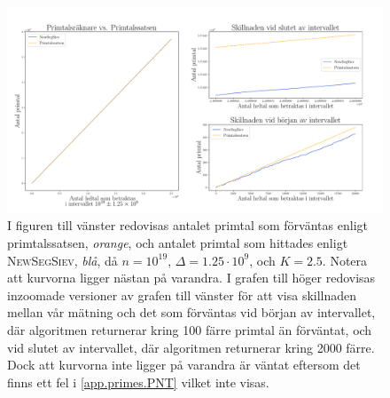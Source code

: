 \begin{figure}[h] %
    \centering
    \includegraphics[width = \textwidth]{coen/Images/Primes.pdf}
    \caption{I figuren till vänster redovisas antalet primtal som förväntas enligt primtalssatsen, \textit{orange}, och antalet primtal som hittades enligt \textsc{NewSegSiev}, \textit{blå}, då \(n = 10^{19}\), \(\Delta = 1.25\cdot10^{9}\), och \(K = 2.5\). 
    Notera att kurvorna ligger nästan på varandra. 
    I grafen till höger redovisas inzoomade versioner av grafen till vänster för att visa skillnaden mellan vår mätning och det som förväntas vid början av intervallet, där algoritmen returnerar kring 100 färre primtal än förväntat, och vid slutet av intervallet, där algoritmen returnerar kring 2000 färre.
    Dock att kurvorna inte ligger på varandra är väntat eftersom det finns ett fel i \ref{app.primes.PNT} vilket inte visas.}
    \label{fig:res.prime}
\end{figure}

